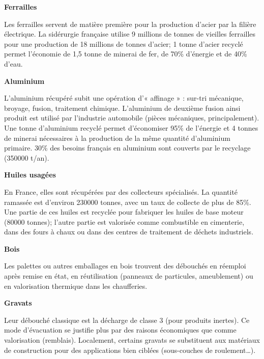 \textbf{Ferrailles} 
\vspace{0.3 cm}

Les ferrailles servent de matière première pour la production d’acier par la filière électrique. La sidérurgie française utilise 9 millions de tonnes de vieilles ferrailles pour une production de 18 millions de tonnes d’acier; 1 tonne d’acier recyclé permet l’économie de 1,5 tonne de minerai de fer, de 70\% d’énergie et de 40\% d’eau.
\vspace{0.3 cm}

\textbf{Aluminium} 
\vspace{0.3 cm}

L’aluminium récupéré subit une opération d’« affinage » : sur-tri mécanique, broyage, fusion, traitement chimique. L’aluminium de deuxième fusion ainsi produit est utilisé par l’industrie automobile (pièces mécaniques, principalement). Une tonne d’aluminium recyclé permet d’économiser 95\% de l’énergie et 4 tonnes de minerai nécessaires à la production de la même quantité d’aluminium primaire. 30\% des besoins français en aluminium sont couverts par le recyclage (350000 t/an).
\vspace{0.3 cm}

\textbf{Huiles usagées}
\vspace{0.3 cm}

En France, elles sont récupérées par des collecteurs spécialisés. La quantité ramassée est d’environ 230000 tonnes, avec un taux de collecte de plus de 85\%. Une partie de ces huiles est recyclée pour fabriquer les huiles de base moteur (80000 tonnes); l’autre partie est valorisée comme combustible en cimenterie, dans des fours à chaux ou dans des centres de traitement de déchets industriels.
\vspace{0.3 cm}

\textbf{Bois}
\vspace{0.3 cm}

Les palettes ou autres emballages en bois trouvent des débouchés en réemploi après remise en état, en réutilisation (panneaux de particules, ameublement) ou en valorisation thermique dans les chaufferies.
\vspace{0.3 cm}

\textbf{Gravats}
\vspace{0.3 cm}

Leur débouché classique est la décharge de classe 3 (pour produits inertes). Ce mode d’évacuation se justifie plus par des raisons économiques que comme valorisation (remblais). Localement, certains gravats se substituent aux matériaux de construction pour des applications bien ciblées (sous-couches de roulement…).
\vspace{0.3 cm}

